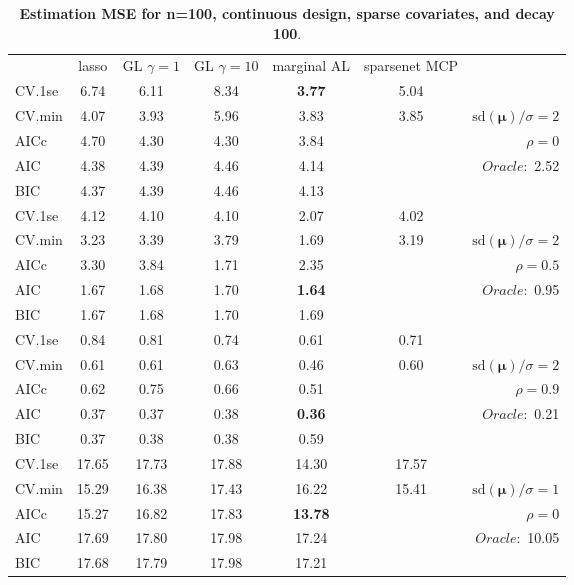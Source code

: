 \clearpage
\begin{table}\vspace{-.5cm}
\caption[l]{ { \bf Estimation MSE for n=100, continuous design, 
sparse covariates, and  decay  100}.}
\vspace{-.5cm}
\footnotesize{}
\begin{center}
\begin{tabular}{l*{5}{c}|r}
& lasso & GL $\gamma=1$ & GL $\gamma=10$ & marginal AL & sparsenet MCP  & \\
 \cline{1-7}
CV.1se & 6.74 & 6.11 & 8.34 & {\bf 3.77} & 5.04 & \\
CV.min & 4.07 & 3.93 & 5.96 & 3.83 & 3.85 &  $\mathrm{sd}(\mathbf{\mu})/\sigma=2$ \\
AICc & 4.70 & 4.30 & 4.30 & 3.84 & & $\rho=0$ \\
AIC & 4.38 & 4.39 & 4.46 & 4.14 & &  \multirow{2}{*}{$Oracle: $ 2.52} \\
BIC & 4.37 & 4.39 & 4.46 & 4.13 & &  \\
 \hline 
CV.1se & 4.12 & 4.10 & 4.10 & 2.07 & 4.02 & \\
CV.min & 3.23 & 3.39 & 3.79 & 1.69 & 3.19 &  $\mathrm{sd}(\mathbf{\mu})/\sigma=2$ \\
AICc & 3.30 & 3.84 & 1.71 & 2.35 & & $\rho=0.5$ \\
AIC & 1.67 & 1.68 & 1.70 & {\bf 1.64} & &  \multirow{2}{*}{$Oracle: $ 0.95} \\
BIC & 1.67 & 1.68 & 1.70 & 1.69 & &  \\
 \hline 
CV.1se & 0.84 & 0.81 & 0.74 & 0.61 & 0.71 & \\
CV.min & 0.61 & 0.61 & 0.63 & 0.46 & 0.60 &  $\mathrm{sd}(\mathbf{\mu})/\sigma=2$ \\
AICc & 0.62 & 0.75 & 0.66 & 0.51 & & $\rho=0.9$ \\
AIC & 0.37 & 0.37 & 0.38 & {\bf 0.36} & &  \multirow{2}{*}{$Oracle: $ 0.21} \\
BIC & 0.37 & 0.38 & 0.38 & 0.59 & &  \\
 \hline 
CV.1se & 17.65 & 17.73 & 17.88 & 14.30 & 17.57 & \\
CV.min & 15.29 & 16.38 & 17.43 & 16.22 & 15.41 &  $\mathrm{sd}(\mathbf{\mu})/\sigma=1$ \\
AICc & 15.27 & 16.82 & 17.83 & {\bf 13.78} & & $\rho=0$ \\
AIC & 17.69 & 17.80 & 17.98 & 17.24 & &  \multirow{2}{*}{$Oracle: $ 10.05} \\
BIC & 17.68 & 17.79 & 17.98 & 17.21 & &  \\

\end{tabular}
\end{center}
\end{table}
